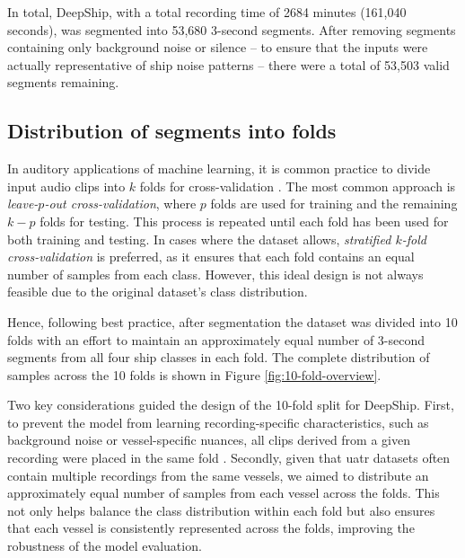 In total, DeepShip, with a total recording time of 2684 minutes (161,040 seconds), was segmented into 53,680 3-second segments. After removing segments containing only background noise or silence -- to ensure that the inputs were actually representative of ship noise patterns -- there were a total of 53,503 valid segments remaining.

\subsection{Distribution of segments into folds}

In auditory applications of machine learning, it is common practice to divide input audio clips into $k$ folds for cross-validation \cite{chi_classifying_2022, basili_classification_2004, zeng_spectrogram_2019, chen_ship-radiated_2024, chen_hierarchical_2024}. The most common approach is \textit{leave-$p$-out cross-validation}, where $p$ folds are used for training and the remaining $k-p$ folds for testing. This process is repeated until each fold has been used for both training and testing. In cases where the dataset allows, \textit{stratified $k$-fold cross-validation} is preferred, as it ensures that each fold contains an equal number of samples from each class. However, this ideal design is not always feasible due to the original dataset's class distribution.

Hence, following best practice, after segmentation the dataset was divided into 10 folds with an effort to maintain an approximately equal number of 3-second segments from all four ship classes in each fold. The complete distribution of samples across the 10 folds is shown in Figure \ref{fig:10-fold-overview}.

Two key considerations guided the design of the 10-fold split for DeepShip. First, to prevent the model from learning recording-specific characteristics, such as background noise or vessel-specific nuances, all clips derived from a given recording were placed in the same fold \cite{chi_classifying_2022}. Secondly, given that \acrshort{uatr} datasets often contain multiple recordings from the same vessels, we aimed to distribute an approximately equal number of samples from each vessel across the folds. This not only helps balance the class distribution within each fold but also ensures that each vessel is consistently represented across the folds, improving the robustness of the model evaluation.

